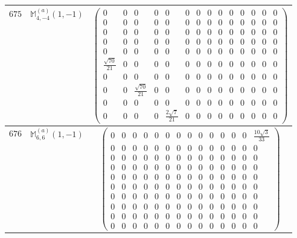\documentclass[fleqn,8pt,landscape]{jsarticle}
\begin{document}
\begin{center}
\begin{longtable}{ccc}
$ 675 $ & $ \mathbb{M}_{4,-4}^{(a)}(1,-1) $ & $ \begin{pmatrix} 0 & 0 & 0 & 0 & 0 & 0 & 0 & 0 & 0 & 0 & 0 & 0 & 0 & 0 \\ 0 & 0 & 0 & 0 & 0 & 0 & 0 & 0 & 0 & 0 & 0 & 0 & 0 & 0 \\ 0 & 0 & 0 & 0 & 0 & 0 & 0 & 0 & 0 & 0 & 0 & 0 & 0 & 0 \\ 0 & 0 & 0 & 0 & 0 & 0 & 0 & 0 & 0 & 0 & 0 & 0 & 0 & 0 \\ 0 & 0 & 0 & 0 & 0 & 0 & 0 & 0 & 0 & 0 & 0 & 0 & 0 & 0 \\ \frac{\sqrt{70}}{21} & 0 & 0 & 0 & 0 & 0 & 0 & 0 & 0 & 0 & 0 & 0 & 0 & 0 \\ 0 & 0 & 0 & 0 & 0 & 0 & 0 & 0 & 0 & 0 & 0 & 0 & 0 & 0 \\ 0 & 0 & \frac{\sqrt{70}}{21} & 0 & 0 & 0 & 0 & 0 & 0 & 0 & 0 & 0 & 0 & 0 \\ 0 & 0 & 0 & 0 & 0 & 0 & 0 & 0 & 0 & 0 & 0 & 0 & 0 & 0 \\ 0 & 0 & 0 & 0 & \frac{2 \sqrt{7}}{21} & 0 & 0 & 0 & 0 & 0 & 0 & 0 & 0 & 0 \end{pmatrix} $ \\ \hline
$ 676 $ & $ \mathbb{M}_{6,6}^{(a)}(1,-1) $ & $ \begin{pmatrix} 0 & 0 & 0 & 0 & 0 & 0 & 0 & 0 & 0 & 0 & 0 & 0 & 0 & \frac{10 \sqrt{3}}{33} \\ 0 & 0 & 0 & 0 & 0 & 0 & 0 & 0 & 0 & 0 & 0 & 0 & 0 & 0 \\ 0 & 0 & 0 & 0 & 0 & 0 & 0 & 0 & 0 & 0 & 0 & 0 & 0 & 0 \\ 0 & 0 & 0 & 0 & 0 & 0 & 0 & 0 & 0 & 0 & 0 & 0 & 0 & 0 \\ 0 & 0 & 0 & 0 & 0 & 0 & 0 & 0 & 0 & 0 & 0 & 0 & 0 & 0 \\ 0 & 0 & 0 & 0 & 0 & 0 & 0 & 0 & 0 & 0 & 0 & 0 & 0 & 0 \\ 0 & 0 & 0 & 0 & 0 & 0 & 0 & 0 & 0 & 0 & 0 & 0 & 0 & 0 \\ 0 & 0 & 0 & 0 & 0 & 0 & 0 & 0 & 0 & 0 & 0 & 0 & 0 & 0 \\ 0 & 0 & 0 & 0 & 0 & 0 & 0 & 0 & 0 & 0 & 0 & 0 & 0 & 0 \\ 0 & 0 & 0 & 0 & 0 & 0 & 0 & 0 & 0 & 0 & 0 & 0 & 0 & 0 \end{pmatrix} $ \\ \hline

\end{longtable}
\end{center}
\end{document}
